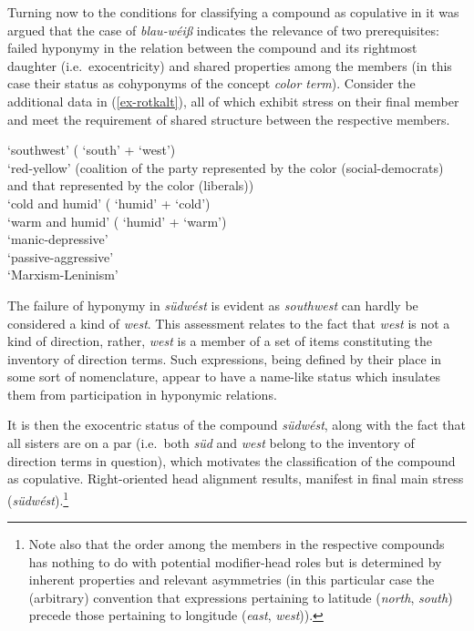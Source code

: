 \documentclass[output=paper
 ,nobabel
 ,draftmode
 ,colorlinks, citecolor=brown
]{langscibook}
\begin{document}
Turning now to the conditions for classifying a compound as copulative in  it was argued that the case of \emph{blau-wéiß}
indicates the relevance of two prerequisites: failed hyponymy in the relation between the compound and its rightmost daughter (i.e.\ exocentricity) and shared properties among the members (in this case their status as cohyponyms of the concept \emph{color term}). Consider the additional data in (\ref{ex-rotkalt}), all of which exhibit stress on their final member and meet the requirement of shared structure between the respective members. 


\eal\label{ex-rotkalt}

\ex\label{ex-südwest}
 `southwest' ( `south' +  `west') \\

\ex\label{ex-rotgelb}
 `red-yellow' (coalition of the party represented by the color  (social-democrats) and that represented by the color  (liberals))\\

\ex\label{ex-feuchtkalt}
 `cold and humid' ( `humid' +  `cold') \\ 
 `warm and humid' ( `humid' +  `warm') \\ 

\ex\label{ex-manisch}
 `manic-depressive' \\
 `passive-aggressive' \\ 

\ex\label{ex-Marxismus}
 `Marxism-Leninism' \\

\zl

\noindent
The failure of hyponymy in \emph{südwést} is evident as \emph{southwest} can hardly be considered a kind of \emph{west}. This assessment relates to the fact that \emph{west} is not a kind of direction, rather, \emph{west} is a member of a set of items constituting the inventory of direction terms. Such expressions, being defined by their place in some sort of nomenclature, appear to have a name-like status which insulates them from participation in hyponymic relations. 
 
 It is then the exocentric status of the compound \emph{südwést}, along with the fact that all sisters are on a par (i.e.\ both \emph{süd} and \emph{west} belong to the inventory of direction terms in question), which motivates the classification of the compound as copulative. Right-oriented head alignment results, manifest in final main stress (\emph{südwést}).\footnote{Note also that the order among the members in the respective compounds has nothing to do with potential modifier-head roles but is determined by inherent properties and relevant asymmetries (in this particular case the (arbitrary) convention that expressions pertaining to latitude (\emph{north}, \emph{south}) precede those pertaining to longitude (\emph{east}, \emph{west})).}
\end{document}

